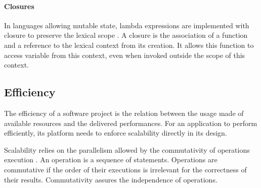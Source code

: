 \paragraph{Closures}
In languages allowing mutable state, lambda expressions are implemented with closure to preserve the lexical scope \cite{Sussman1998}.
A closure is the association of a function and a reference to the lexical context from its creation.
It allows this function to access variable from this context, even when invoked outside the scope of this context.


\subsection{Efficiency} \label{chapter3:definitions:efficiency}

The efficiency of a software project is the relation between the usage made of available resources and the delivered performances.
For an application to perform efficiently, its platform needs to enforce scalability directly in its design.

Scalability relies on the parallelism allowed by the commutativity of operations execution \cite{Clements2013a}.
An operation is a sequence of statements.
Operations are commutative if the order of their executions is irrelevant for the correctness of their results.
Commutativity assures the independence of operations.


